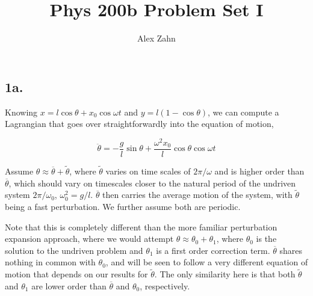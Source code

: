 \documentclass[12pt]{article}
\author{Alex Zahn}
\title{Phys 200b Problem Set I}
\date{}
\begin{document}
\maketitle

\newcommand{\tb}{\overline{\theta}}
\newcommand{\tti}{\tilde{\theta}}
\newcommand{\dtb}{\dot{\overline{\theta}}}
\newcommand{\dtti}{\dot{\tilde{\theta}}}
\newcommand{\ddtb}{\ddot{\overline{\theta}}}
\newcommand{\ddtti}{\ddot{\tilde{\theta}}}

\newcommand{\pb}{\overline{\varphi}}
\newcommand{\pti}{\tilde{\varphi}}
\newcommand{\dpb}{\dot{\overline{\varphi}}}
\newcommand{\dpti}{\dot{\tilde{\varphi}}}
\newcommand{\ddpb}{\ddot{\overline{\varphi}}}
\newcommand{\ddpti}{\ddot{\tilde{\varphi}}}

\newcommand{\coswt}{\cos\omega t}
\newcommand{\sinwt}{\sin\omega t}

\newcommand{\wn}{\omega_0}

\newcommand{\average}[2]{ \left\langle\ #1 \right\rangle_#2  }

\newcommand{\ueff}{u_{\textit{eff}}}

\subsection*{1a.}

Knowing \(x=l\cos\theta + x_{0}\cos\omega t\) and \(y = l(1-\cos\theta)\), we can compute a Lagrangian that goes over straightforwardly into the equation of motion,

\[\ddot{\theta} = -\frac{g}{l}\sin\theta + \frac{\omega^2x_0}{l}\cos\theta\cos\omega t
\]

Assume \(\theta\approx\tb+\tti\), where \(\tti\) varies on time scales of \(2\pi/\omega\) and is higher order than \(\tb\), which should vary on timescales closer to the natural period of the undriven system \( 2\pi/\wn\), \( \wn^2=g/l  \). \(\tb\) then carries the average motion of the system, with \(\tti\) being a fast perturbation. We further assume both are periodic.

Note that this is completely different than the more familiar perturbation expansion approach, where we would attempt \(\theta \approx \theta_0 + \theta_1\), where \(\theta_0\) is the solution to the undriven problem and \( \theta _1\) is a first order correction term. \(\tb\) shares nothing in common with \(\theta_0\), and will be seen to follow a very different equation of motion that depends on our results for \(\tti\). The only similarity here is that both \(\tti\) and \(\theta_1\) are lower order than \(\tb\) and \(\theta_0\), respectively.
\end{document}
